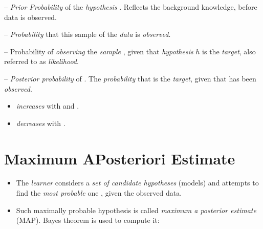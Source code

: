 \documentclass[
	number={3},
	title={Na\"iive Bayes Learning}
]{cs584notes}
\begin{document}
\begin{description}[font=\color{red}]
	\item[$P(h)$] -- \emph{Prior Probability} of the \emph{hypothesis} . Reflects the background knowledge, before data is observed.
	\item[$P(D)$] -- \emph{Probability} that this sample of the \emph{data} is \emph{observed}.
	\item[$P(D|h)$] -- {Probability} of \emph{observing} the \emph{sample} , given that \emph{hypothesis} $h$ is the \emph{target}, also referred to as \emph{likelihood}.
	\item[$P(h|D)$] -- \emph{Posterior probability} of . The \emph{probability} that  is the \emph{target}, given that  has been \emph{observed}.
\end{description}

\begin{itemize}
	\item {} \emph{increases} with  and .
	\item {} \emph{decreases} with .
\end{itemize}

\section{Maximum APosteriori Estimate}\label{sec:maximum-aposteriori-estimate}
\begin{itemize}
	\item The \emph{learner} considers a \emph{set of candidate hypotheses}  (models) and attempts to find the \emph{most probable} one , given the observed data.
	\item Such maximally probable hypothesis is called \emph{maximum a posterior estimate} (MAP). Bayes theorem is used to compute it:
	\data{\begin{equation*}
	\begin{aligned}
		h_{MAP} &= \arg\max_{h\in H}P(h|D)\\
				&= \arg\max_{h\in H}\frac{P(D|h)\times P(h)}{P(D)}\\
				&= \arg\max_{h\in H}P(D|h)\times P(h)\\%
	\end{aligned}
	\end{equation*}}
\end{itemize}
\end{document}
